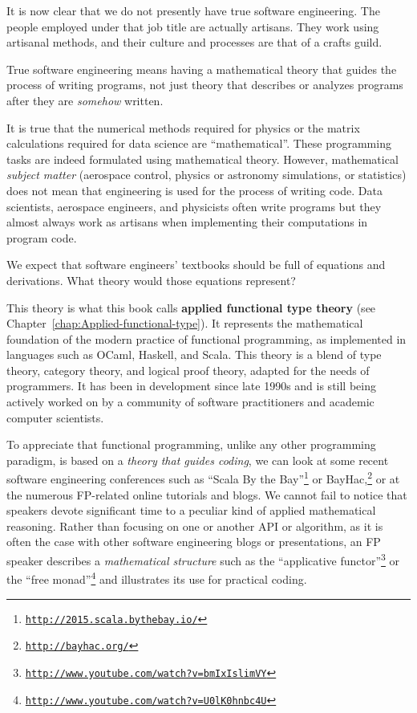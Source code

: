 It is now clear that we do not presently have true software engineering.
The people employed under that job title are actually artisans. They
work using artisanal methods, and their culture and processes are
that of a crafts guild.

True software engineering means having a mathematical theory that
guides the process of writing programs, \textemdash{} not just theory
that describes or analyzes programs after they are \emph{somehow}
written.

It is true that the numerical methods required for physics or the
matrix calculations required for data science are \textsf{``}mathematical\textsf{''}.
These programming tasks are indeed formulated using mathematical theory.
However, mathematical \emph{subject matter} (aerospace control, physics
or astronomy simulations, or statistics) does not mean that engineering
is used for the process of writing code. Data scientists, aerospace
engineers, and physicists often write programs \textemdash{} but they
almost always work as artisans when implementing their computations
in program code.

We expect that software engineers\textsf{'} textbooks should be full
of equations and derivations. What theory would those equations represent?

This theory is what this book calls \textbf{applied functional type
theory} (see Chapter~\ref{chap:Applied-functional-type}).
It represents the mathematical foundation of the modern practice of
functional programming, as implemented in languages such as OCaml,
Haskell, and Scala. This theory is a blend of type theory, category
theory, and logical proof theory, adapted for the needs of programmers.
It has been in development since late 1990s and is still being actively
worked on by a community of software practitioners and academic computer
scientists.

To appreciate that functional programming, unlike any other programming
paradigm, is based on a \emph{theory that guides coding}, we can look
at some recent software engineering conferences such as \textsf{``}Scala By
the Bay\textsf{''}\footnote{\texttt{\href{http://2015.scala.bythebay.io/}{http://2015.scala.bythebay.io/}}}
or BayHac,\footnote{\texttt{\href{http://bayhac.org/}{http://bayhac.org/}}}
or at the numerous FP-related online tutorials and blogs. We cannot
fail to notice that speakers devote significant time to a peculiar
kind of applied mathematical reasoning. Rather than focusing on one
or another API or algorithm, as it is often the case with other software
engineering blogs or presentations, an FP speaker describes a \emph{mathematical
structure} \textemdash{} such as the \textsf{``}applicative functor\textsf{''}\footnote{\texttt{\href{http://www.youtube.com/watch?v=bmIxIslimVY}{http://www.youtube.com/watch?v=bmIxIslimVY}}}
or the \textsf{``}free monad\textsf{''}\footnote{\texttt{\href{http://www.youtube.com/watch?v=U0lK0hnbc4U}{http://www.youtube.com/watch?v=U0lK0hnbc4U}}}
\textemdash{} and illustrates its use for practical coding.

